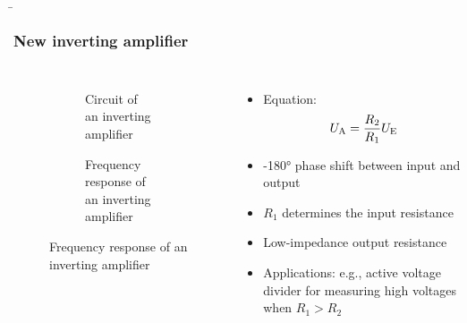 \begin{frame}
    \b{
    \frametitle{New inverting amplifier}
    \begin{columns}
        \centering
        \begin{figure}
    \centering

    \begin{subfigure}{\linewidth}
        \centering
        \resizebox{0.6\linewidth}{!}{}
        \caption{Circuit of an inverting amplifier}
    \end{subfigure}

    \vspace{0.5cm} 

    \begin{subfigure}{\linewidth}
        \centering
        \resizebox{0.6\linewidth}{!}{}
        \caption{Frequency response of an inverting amplifier}
    \end{subfigure}

\end{figure}

        \begin{itemize}
            \item Equation:
           \[
    U_{\textnormal{A}} = \frac{R_2}{R_1} U_{\textnormal{E}}
            \]
    \item -180° phase shift between input and output
    \item $R_1$ determines the input resistance
    \item Low-impedance output resistance
    \item Applications: e.g., active voltage divider for measuring high voltages when $R_1 > R_2$
        \end{itemize}
    \end{columns}
    }
\end{frame}

